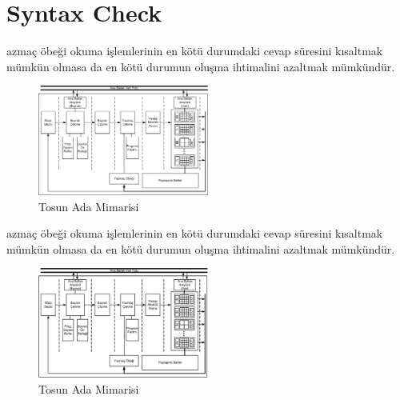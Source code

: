 \chapter{Syntax Check}
azmaç öbeği okuma işlemlerinin en kötü durumdaki cevap süresini kısaltmak mümkün olmasa da en kötü durumun oluşma ihtimalini azaltmak mümkündür.
\begin{figure}[h] \label{image:adaMimarisi}
\centering \includegraphics[width=0.5\textwidth]{gorsel/adaMimarisi.png} \caption{Tosun Ada Mimarisi}  
\end{figure}
azmaç öbeği okuma işlemlerinin en kötü durumdaki cevap süresini kısaltmak mümkün olmasa da en kötü durumun oluşma ihtimalini azaltmak mümkündür.
\begin{figure}[h] \label{image:adaMimarisi}
\centering \includegraphics[width=0.5\textwidth]{gorsel/adaMimarisi.eps} \caption{Tosun Ada Mimarisi}  
\end{figure}